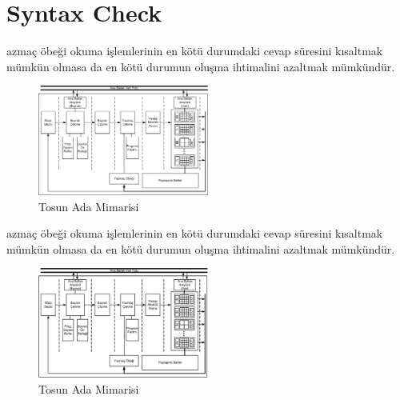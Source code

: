 \chapter{Syntax Check}
azmaç öbeği okuma işlemlerinin en kötü durumdaki cevap süresini kısaltmak mümkün olmasa da en kötü durumun oluşma ihtimalini azaltmak mümkündür.
\begin{figure}[h] \label{image:adaMimarisi}
\centering \includegraphics[width=0.5\textwidth]{gorsel/adaMimarisi.png} \caption{Tosun Ada Mimarisi}  
\end{figure}
azmaç öbeği okuma işlemlerinin en kötü durumdaki cevap süresini kısaltmak mümkün olmasa da en kötü durumun oluşma ihtimalini azaltmak mümkündür.
\begin{figure}[h] \label{image:adaMimarisi}
\centering \includegraphics[width=0.5\textwidth]{gorsel/adaMimarisi.eps} \caption{Tosun Ada Mimarisi}  
\end{figure}